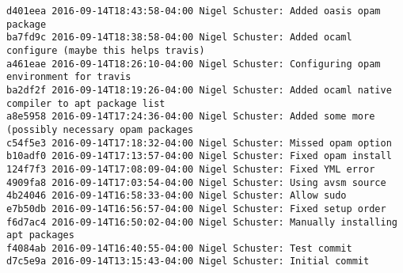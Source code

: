 \begin{lstlisting}
d401eea 2016-09-14T18:43:58-04:00 Nigel Schuster: Added oasis opam package
ba7fd9c 2016-09-14T18:38:58-04:00 Nigel Schuster: Added ocaml configure (maybe this helps travis)
a461eae 2016-09-14T18:26:10-04:00 Nigel Schuster: Configuring opam environment for travis
ba2df2f 2016-09-14T18:19:26-04:00 Nigel Schuster: Added ocaml native compiler to apt package list
a8e5958 2016-09-14T17:24:36-04:00 Nigel Schuster: Added some more (possibly necessary opam packages
c54f5e3 2016-09-14T17:18:32-04:00 Nigel Schuster: Missed opam option
b10adf0 2016-09-14T17:13:57-04:00 Nigel Schuster: Fixed opam install
124f7f3 2016-09-14T17:08:09-04:00 Nigel Schuster: Fixed YML error
4909fa8 2016-09-14T17:03:54-04:00 Nigel Schuster: Using avsm source
4b24046 2016-09-14T16:58:33-04:00 Nigel Schuster: Allow sudo
e7b50db 2016-09-14T16:56:57-04:00 Nigel Schuster: Fixed setup order
f6d7ac4 2016-09-14T16:50:02-04:00 Nigel Schuster: Manually installing apt packages
f4084ab 2016-09-14T16:40:55-04:00 Nigel Schuster: Test commit
d7c5e9a 2016-09-14T13:15:43-04:00 Nigel Schuster: Initial commit

\end{lstlisting}
